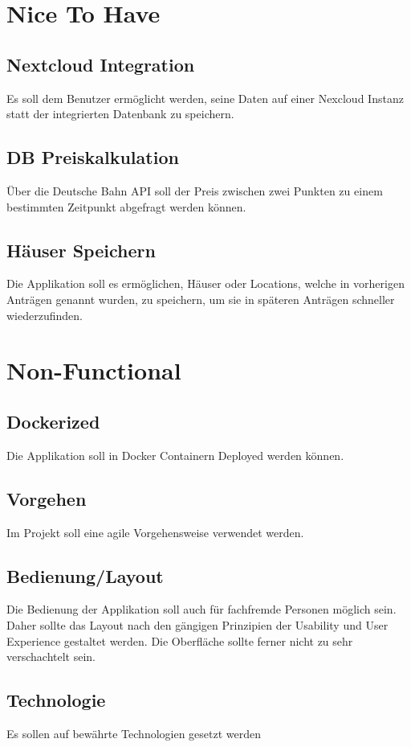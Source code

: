 \section{Nice To Have}\label{sec:nice-to-have}
\subsection{Nextcloud Integration}\label{subsec:nextcloud-integration}
Es soll dem Benutzer ermöglicht werden, seine Daten auf einer Nexcloud Instanz statt der integrierten Datenbank zu speichern.
\subsection{DB Preiskalkulation}\label{subsec:db-preiskalkulation}
Über die Deutsche Bahn \ac{API} soll der Preis zwischen zwei Punkten zu einem bestimmten Zeitpunkt abgefragt werden können.
\subsection{Häuser Speichern}\label{subsec:hauser-speichern}
Die Applikation soll es ermöglichen, Häuser oder Locations, welche in vorherigen Anträgen genannt wurden, zu speichern,
um sie in späteren Anträgen schneller wiederzufinden.

\section{Non-Functional}\label{sec:non-functional}
\subsection{Dockerized}\label{subsec:dockerized}
Die Applikation soll in Docker Containern Deployed werden können.
\subsection{Vorgehen}\label{subsec:vorgehen}
Im Projekt soll eine agile Vorgehensweise verwendet werden.
\subsection{Bedienung/Layout}\label{subsec:bedienung/layout}
Die Bedienung der Applikation soll auch für fachfremde Personen möglich sein.
Daher sollte das Layout nach den gängigen Prinzipien der Usability und User Experience gestaltet werden.
Die Oberfläche sollte ferner nicht zu sehr verschachtelt sein.
\subsection{Technologie}\label{subsec:technologie}
Es sollen auf bewährte Technologien gesetzt werden

